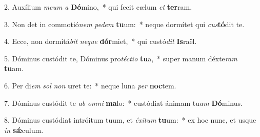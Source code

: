 2. Auxílium \textit{me}\textit{um} \textit{a} \textbf{Dó}mino,~*  qui fecit cælum \textit{et} \textbf{ter}ram.\

3. Non det in commotió\textit{nem} \textit{pe}\textit{dem} \textbf{tu}um:~*  neque dormítet qui \textit{cus}\textbf{tó}dit te.\

4. Ecce, non dormitá\textit{bit} \textit{ne}\textit{que} \textbf{dór}miet,~*  qui custó\textit{dit} \textbf{Is}raël.\

5. Dóminus custódit te, Dóminus pro\textit{téc}\textit{ti}\textit{o} \textbf{tu}a,~*  super manum déxte\textit{ram} \textbf{tu}am.\

6. Per di\textit{em} \textit{sol} \textit{non} \textbf{u}ret te:~*  neque luna \textit{per} \textbf{noc}tem.\

7. Dóminus custódit te \textit{ab} \textit{om}\textit{ni} \textbf{ma}lo:~*  custódiat ánimam tu\textit{am} \textbf{Dó}minus.\

8. Dóminus custódiat intróitum tuum, et \textit{éx}\textit{i}\textit{tum} \textbf{tu}um:~*  ex hoc nunc, et usque \textit{in} \textbf{sǽ}culum.\

